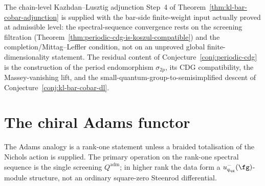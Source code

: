 \begin{corollary}
\label{cor:admissible-kl-finite-weight-input}
\ClaimStatusConditional
The chain-level Kazhdan--Lusztig adjunction Step~4 of
Theorem~\ref{thm:kl-bar-cobar-adjunction} is supplied with the
bar-side finite-weight input actually proved at admissible level: the
spectral-sequence convergence rests on the screening filtration
\textup{(}Theorem~\ref{thm:periodic-cdg-is-koszul-compatible}\textup{)}
and the completion/Mittag--Leffler condition, not on an unproved
global finite-dimensionality statement.  The residual content of
Conjecture~\ref{conj:periodic-cdg} is the construction of the
period endomorphism $\sigma_{2p}$, its CDG compatibility, the
Massey-vanishing lift, and the small-quantum-group-to-semisimplified
descent of Conjecture~\ref{conj:kl-bar-cobar-dl}.
\end{corollary}

\section{The chiral Adams functor}
\label{sec:chiral-adams-functor}

The Adams analogy is a rank-one statement unless a braided
totalisation of the Nichols action is supplied.  The primary operation
on the rank-one spectral sequence is the single screening
$Q^{\mathrm{adm}}$; in higher rank the data form a
$u_{q_{\mathrm{qg}}}^-(\fg)$-module structure, not an ordinary
square-zero Steenrod differential.

